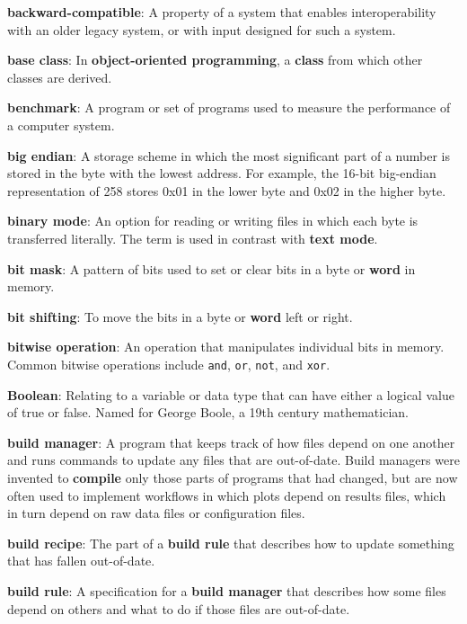 \documentclass{scrbook}
\newcommand{\glosskey}[1]{\textbf{#1}}
\begin{document}
\noindent \textbf{\glosskey{backward-compatible}}: 
A property of a system that enables interoperability with an older legacy system, or with input designed for such a system.


\noindent \textbf{\glosskey{base class}}: 
In \glosskey{object-oriented programming}, a \glosskey{class} from which other classes are derived.


\noindent \textbf{\glosskey{benchmark}}: 
A program or set of programs used to measure the performance of a computer system.


\noindent \textbf{\glosskey{big endian}}: 
A storage scheme in which the most significant part of a number is stored in the byte with the lowest address. For example, the 16-bit big-endian representation of 258 stores 0x01 in the lower byte and 0x02 in the higher byte.


\noindent \textbf{\glosskey{binary mode}}: 
An option for reading or writing files in which each byte is transferred literally. The term is used in contrast with \glosskey{text mode}.


\noindent \textbf{\glosskey{bit mask}}: 
A pattern of bits used to set or clear bits in a byte or \glosskey{word} in memory.


\noindent \textbf{\glosskey{bit shifting}}: 
To move the bits in a byte or \glosskey{word} left or right.


\noindent \textbf{\glosskey{bitwise operation}}: 
An operation that manipulates individual bits in memory. Common bitwise operations include \texttt{and}, \texttt{or}, \texttt{not}, and \texttt{xor}.


\noindent \textbf{\glosskey{Boolean}}: 
Relating to a variable or data type that can have either a logical value of true or false. Named for George Boole, a 19th century mathematician.


\noindent \textbf{\glosskey{build manager}}: 
A program that keeps track of how files depend on one another and runs commands to update any files that are out-of-date. Build managers were invented to \glosskey{compile} only those parts of programs that had changed, but are now often used to implement workflows in which plots depend on results files, which in turn depend on raw data files or configuration files.


\noindent \textbf{\glosskey{build recipe}}: 
The part of a \glosskey{build rule} that describes how to update something that has fallen out-of-date.


\noindent \textbf{\glosskey{build rule}}: 
A specification for a \glosskey{build manager} that describes how some files depend on others and what to do if those files are out-of-date.
\end{document}
